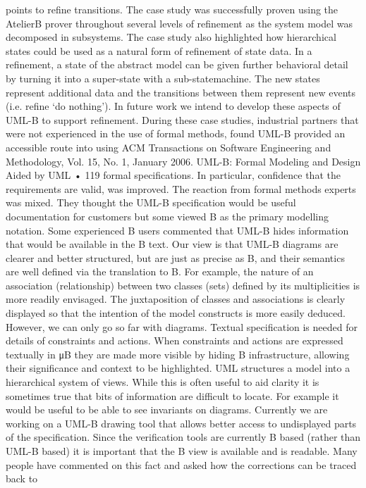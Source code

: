 points to refine transitions. The case study was successfully proven using the
AtelierB prover throughout several levels of refinement as the system model
was decomposed in subsystems. The case study also highlighted how hierarchical states could be used as a natural form of refinement of state data. In a
refinement, a state of the abstract model can be given further behavioral detail
by turning it into a super-state with a sub-statemachine. The new states represent additional data and the transitions between them represent new events
(i.e. refine ‘do nothing’). In future work we intend to develop these aspects of
UML-B to support refinement.
During these case studies, industrial partners that were not experienced in
the use of formal methods, found UML-B provided an accessible route into using
ACM Transactions on Software Engineering and Methodology, Vol. 15, No. 1, January 2006.
UML-B: Formal Modeling and Design Aided by UML • 119
formal specifications. In particular, confidence that the requirements are valid,
was improved. The reaction from formal methods experts was mixed. They
thought the UML-B specification would be useful documentation for customers
but some viewed B as the primary modelling notation.
Some experienced B users commented that UML-B hides information that
would be available in the B text. Our view is that UML-B diagrams are clearer
and better structured, but are just as precise as B, and their semantics are well
defined via the translation to B. For example, the nature of an association (relationship) between two classes (sets) defined by its multiplicities is more readily
envisaged. The juxtaposition of classes and associations is clearly displayed so
that the intention of the model constructs is more easily deduced. However, we
can only go so far with diagrams. Textual specification is needed for details of
constraints and actions. When constraints and actions are expressed textually
in μB they are made more visible by hiding B infrastructure, allowing their
significance and context to be highlighted. UML structures a model into a hierarchical system of views. While this is often useful to aid clarity it is sometimes
true that bits of information are difficult to locate. For example it would be
useful to be able to see invariants on diagrams. Currently we are working on
a UML-B drawing tool that allows better access to undisplayed parts of the
specification.
Since the verification tools are currently B based (rather than UML-B based)
it is important that the B view is available and is readable. Many people have
commented on this fact and asked how the corrections can be traced back to
